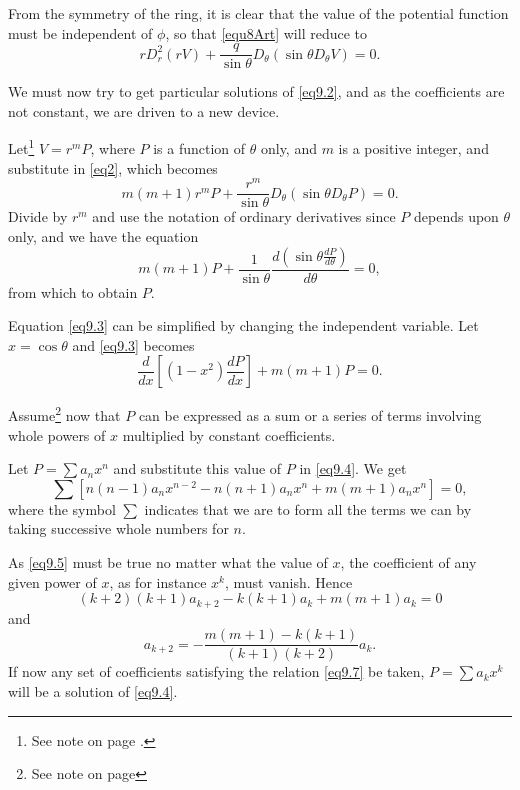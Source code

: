 \documentclass[oneside,12pt]{book}
\begin{document}
From the symmetry of the ring, it is clear that the value of the potential function must be independent of $\phi$, so that \eqref{equ8Art} will reduce to 
\begin{equation}
    rD_r^2(rV)+\frac{q}{\sin\theta}D_\theta(\sin\theta D_\theta V)=0.
    \label{eq9.2}
\end{equation} \par 

We must now try to get particular solutions of \eqref{eq9.2}, and as the coefficients are not constant, we are driven to a new device. \par 

Let\footnote{See note on page \pageref{note2}.} $V=r^mP$, where $P$ is a function of $\theta$ only, and $m$ is a positive integer, and substitute in \eqref{eq2}, which becomes 
$$m(m+1)r^mP+\frac{r^m}{\sin\theta}D_\theta(\sin\theta D_\theta P)=0.$$
Divide by $r^m$ and use the notation of ordinary derivatives since $P$ depends upon $\theta$ only, and we have the equation 
\begin{equation}
    m(m+1)P+\frac{1}{\sin\theta}\frac{d\left(\sin\theta\frac{dP}{d\theta}\right)}{d\theta}=0,
    \label{eq9.3}
\end{equation}
from which to obtain $P$. \par 

Equation \eqref{eq9.3} can be simplified by changing the independent variable. Let $x=\cos\theta$ and \eqref{eq9.3} becomes 
\begin{equation}
    \frac{d}{dx}\left[(1-x^2)\frac{dP}{dx}\right]+m(m+1)P=0.
    \label{eq9.4}
\end{equation} \par 

Assume\footnote{See note on page \pageref{note2}} now that $P$ can be expressed as a sum or a series of terms involving whole powers of $x$ multiplied by constant coefficients. \par 

Let $P=\sum a_nx^n$ and substitute this value of $P$ in \eqref{eq9.4}. We get 
\begin{equation}
    \sum[n(n-1)a_nx^{n-2}-n(n+1)a_nx^n+m(m+1)a_nx^n]=0,
    \label{eq9.5}
\end{equation}
where the symbol $\sum$ indicates that we are to form all the terms we can by taking successive whole numbers for $n$. \par 

As \eqref{eq9.5} must be true no matter what the value of $x$, the coefficient of any given power of $x$, as for instance $x^k$, must vanish. Hence 
\begin{equation}
    (k+2)(k+1)a_{k+2}-k(k+1)a_k+m(m+1)a_k=0
    \label{eq9.6}
\end{equation}
and 
\begin{equation}
    a_{k+2}=-\frac{m(m+1)-k(k+1)}{(k+1)(k+2)}a_k.
    \label{eq9.7}
\end{equation}
If now any set of coefficients satisfying the relation \eqref{eq9.7} be taken, $P=\sum a_kx^k$ will be a solution of \eqref{eq9.4}. \par 
\end{document}
